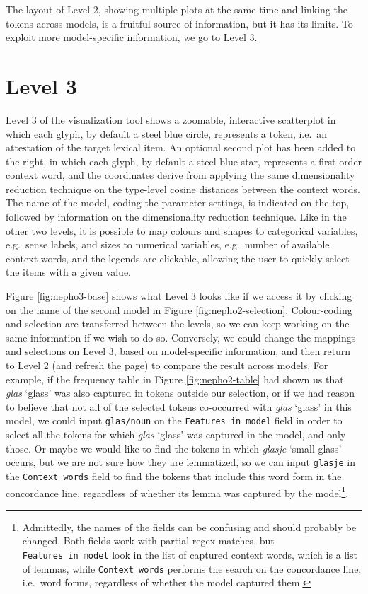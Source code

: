 \documentclass[
]{book}
\begin{document}
The layout of Level 2, showing multiple plots at the same time and linking the tokens across models, is a fruitful source of information, but it has its limits. To exploit more model-specific information, we go to Level 3.

\hypertarget{nepho3}{%
\section{Level 3}\label{nepho3}}

Level 3 of the visualization tool shows a zoomable, interactive scatterplot in which each glyph, by default a steel blue circle, represents a token, i.e.~an attestation of the target lexical item. An optional second plot has been added to the right, in which each glyph, by default a steel blue star, represents a first-order context word, and the coordinates derive from applying the same dimensionality reduction technique on the type-level cosine distances between the context words.
The name of the model, coding the parameter settings, is indicated on the top, followed by information on the dimensionality reduction technique. Like in the other two levels, it is possible to map colours and shapes to categorical variables, e.g.~sense labels, and sizes to numerical variables, e.g.~number of available context words, and the legends are clickable, allowing the user to quickly select the items with a given value.

Figure \ref{fig:nepho3-base} shows what Level 3 looks like if we access it by clicking on the name of the second model in Figure \ref{fig:nepho2-selection}. Colour-coding and selection are transferred between the levels, so we can keep working on the same information if we wish to do so. Conversely, we could change the mappings and selections on Level 3, based on model-specific information, and then return to Level 2 (and refresh the page) to compare the result across models. For example, if the frequency table in Figure \ref{fig:nepho2-table} had shown us that \emph{glas} `glass' was also captured in tokens outside our selection, or if we had reason to believe that not all of the selected tokens co-occurred with \emph{glas} `glass' in this model, we could input \texttt{glas/noun} on the \texttt{Features\ in\ model} field in order to select all the tokens for which \emph{glas} `glass' was captured in the model, and only those. Or maybe we would like to find the tokens in which \emph{glasje} `small glass' occurs, but we are not sure how they are lemmatized, so we can input \texttt{glasje} in the \texttt{Context\ words} field to find the tokens that include this word form in the concordance line, regardless of whether its lemma was captured by the model\footnote{Admittedly, the names of the fields can be confusing and should probably be changed. Both fields work with partial regex matches, but \texttt{Features\ in\ model} look in the list of captured context words, which is a list of lemmas, while \texttt{Context\ words} performs the search on the concordance line, i.e.~word forms, regardless of whether the model captured them.}.
\end{document}
